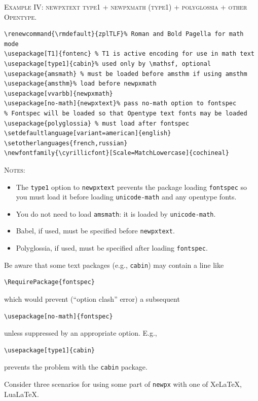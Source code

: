 \documentclass[11pt]{article}
\theoremstyle{oldplain}
\theoremstyle{plain}
\begin{document}
\textsc{Example IV: newpxtext type1 + newpxmath (type1) + polyglossia + other Opentype.}
\begin{verbatim}
\renewcommand{\rmdefault}{zplTLF}% Roman and Bold Pagella for math mode
\usepackage[T1]{fontenc} % T1 is active encoding for use in math text
\usepackage[type1]{cabin}% used only by \mathsf, optional
\usepackage{amsmath} % must be loaded before amsthm if using amsthm
\usepackage{amsthm}% load before newpxmath
\usepackage[vvarbb]{newpxmath}
\usepackage[no-math]{newpxtext}% pass no-math option to fontspec
% Fontspec will be loaded so that Opentype text fonts may be loaded
\usepackage{polyglossia} % must load after fontspec
\setdefaultlanguage[variant=american]{english}
\setotherlanguages{french,russian}
\newfontfamily{\cyrillicfont}[Scale=MatchLowercase]{cochineal}
\end{verbatim}
\textsc{Notes:}
\begin{itemize}
\item The {\tt type1} option to {\tt newpxtext} prevents the package loading {\tt fontspec} so you must load it before loading {\tt unicode-math} and any opentype fonts.
\item
You do not need to load {\tt amsmath}: it is loaded by {\tt unicode-math}.
\item Babel, if used, must be specified before {\tt newpxtext}.
\item Polyglossia, if used, must be specified after loading {\tt fontspec}.
\end{itemize}


Be aware that some text packages (e.g., {\tt cabin}) may contain a line like
\begin{verbatim}
\RequirePackage{fontspec}
\end{verbatim}
which would prevent (``option clash'' error) a subsequent 
\begin{verbatim}
\usepackage[no-math]{fontspec}
\end{verbatim}
unless suppressed by an appropriate option. E.g., 
\begin{verbatim}
\usepackage[type1]{cabin}
\end{verbatim}
prevents the problem with the {\tt cabin} package.

\iffalse
 Consider three scenarios for using some part of {\tt newpx} with one of XeLaTeX, LuaLaTeX.
\end{document}
